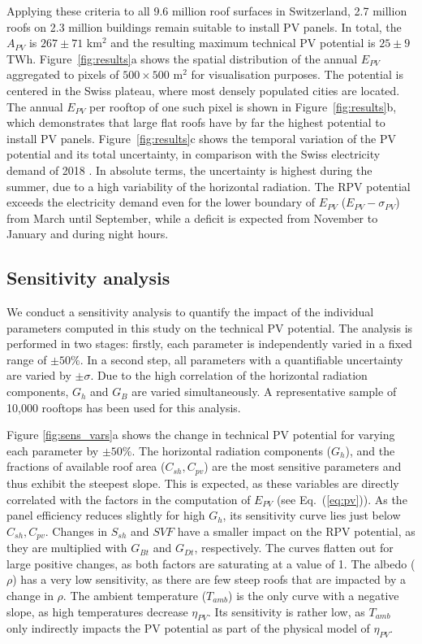 Applying these criteria to all 9.6 million roof surfaces in Switzerland, 2.7 million roofs on 2.3 million buildings remain suitable to install PV panels. 
In total, the $A_{PV}$ is $267 \pm 71$ km$^2$ and the resulting maximum technical PV potential is $25 \pm 9$ TWh. Figure~\ref{fig:results}a shows the spatial distribution of the annual $E_{PV}$ aggregated to pixels of $500 \times 500$ m$^2$ for visualisation purposes. The potential is centered in the Swiss plateau, where most densely populated cities are located.
%
The annual $E_{PV}$ per rooftop of one such pixel is shown in Figure~\ref{fig:results}b, which demonstrates that large flat roofs have by far the highest potential to install PV panels.
%
Figure~\ref{fig:results}c shows the temporal variation of the PV potential and its total uncertainty, in comparison with the Swiss electricity demand of 2018 \cite{swissgrid_production_2019}. In absolute terms, the uncertainty is highest during the summer, due to a high variability of the horizontal radiation. The RPV potential exceeds the electricity demand even for the lower boundary of $E_{PV}$ ($E_{PV} - \sigma_{PV}$) from March until September, while a deficit is expected from November to January and during night hours. 

\subsection{Sensitivity analysis}

We conduct a sensitivity analysis to quantify the impact of the individual parameters computed in this study on the technical PV potential. The analysis is performed in two stages: firstly, each parameter is independently varied in a fixed range of $\pm 50\%$. 
In a second step, all parameters with a quantifiable uncertainty are varied by $\pm \sigma$. 
Due to the high correlation of the horizontal radiation components, $G_h$ and $G_B$ are varied simultaneously. A representative sample of 10,000 rooftops has been used for this analysis.

Figure \ref{fig:sens_vars}a shows the change in technical PV potential for varying each parameter by $\pm 50\%$. The horizontal radiation components ($G_h$), and the fractions of available roof area ($C_{sh}, C_{\mathit{pv}}$) are the most sensitive parameters and thus exhibit the steepest slope. 
This is expected, as these variables are directly correlated with the factors in the computation of $E_{PV}$ (see Eq.~(\ref{eq:pv})). 
As the panel efficiency reduces slightly for high $G_h$, its sensitivity curve lies just below $C_{sh}, C_{\mathit{pv}}$.
Changes in $S_{sh}$ and $\mathit{SVF}$ have a smaller impact on the RPV potential, as they are multiplied with $G_{Bt}$ and $G_{Dt}$, respectively. 
The curves flatten out for large positive changes, as both factors are saturating at a value of 1. 
The albedo ($\rho$) has a very low sensitivity, as there are few steep roofs that are impacted by a change in $\rho$.
The ambient temperature ($T_{amb}$) is the only curve with a negative slope, as high temperatures decrease $\eta_{PV}$. Its sensitivity is rather low, as $T_{amb}$ only indirectly impacts the PV potential as part of the physical model of $\eta_{PV}$. 


